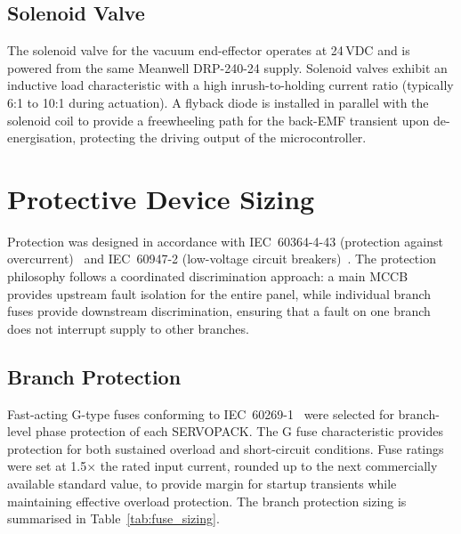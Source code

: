 \subsection{Solenoid Valve}

The solenoid valve for the vacuum end-effector operates at 24\,VDC and is powered from the same Meanwell DRP-240-24 supply. Solenoid valves exhibit an inductive load characteristic with a high inrush-to-holding current ratio (typically 6:1 to 10:1 during actuation). A flyback diode is installed in parallel with the solenoid coil to provide a freewheeling path for the back-EMF transient upon de-energisation, protecting the driving output of the microcontroller.

\section{Protective Device Sizing}

Protection was designed in accordance with IEC~60364-4-43 (protection against overcurrent)~\cite{iec60364} and IEC~60947-2 (low-voltage circuit breakers)~\cite{iec60947}. The protection philosophy follows a coordinated discrimination approach: a main MCCB provides upstream fault isolation for the entire panel, while individual branch fuses provide downstream discrimination, ensuring that a fault on one branch does not interrupt supply to other branches.

\subsection{Branch Protection}

Fast-acting G-type fuses conforming to IEC~60269-1~\cite{iec60269} were selected for branch-level phase protection of each SERVOPACK. The G fuse characteristic provides protection for both sustained overload and short-circuit conditions. Fuse ratings were set at 1.5$\times$ the rated input current, rounded up to the next commercially available standard value, to provide margin for startup transients while maintaining effective overload protection. The branch protection sizing is summarised in Table~\ref{tab:fuse_sizing}.

